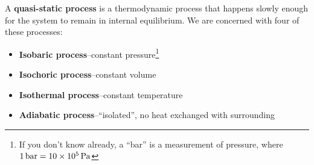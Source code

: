 A \textbf{quasi-static process} is a thermodynamic process that happens slowly
enough for the system to remain in internal equilibrium. We are concerned with
four of these processes:
\begin{itemize}
\item\textbf{Isobaric process}--constant pressure\footnote{If you don't know
  already, a ``bar'' is a measurement of pressure, where
  $\SI1{bar}=\SI{10e5}{\pascal}$}
\item\textbf{Isochoric process}--constant volume
\item\textbf{Isothermal process}--constant temperature
\item\textbf{Adiabatic process}--``isolated'', no heat exchanged with
  surrounding
\end{itemize}

\begin{figure}[ht]
  \centering
  \begin{subfigure}{.4\textwidth}
    \centering
  \end{subfigure}
  \begin{subfigure}{.4\textwidth}
    \centering
  \end{subfigure}
  

\end{figure}

